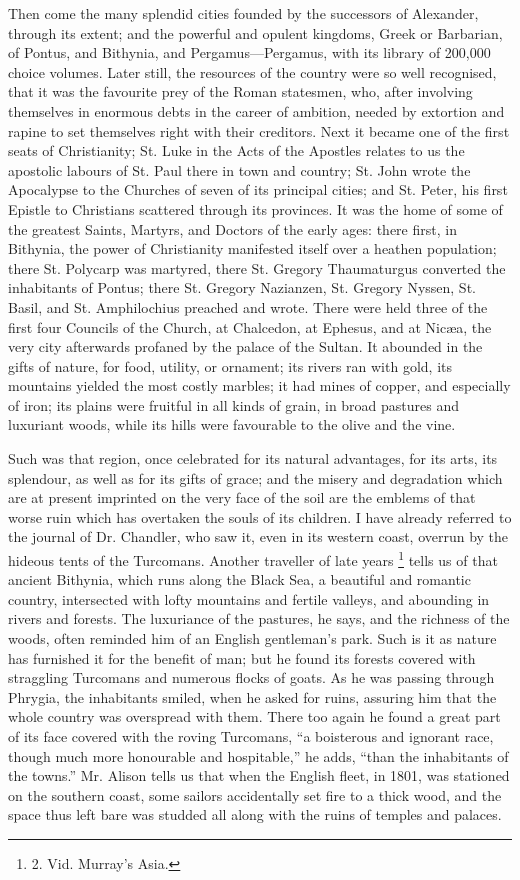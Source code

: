 Then come the many splendid
cities founded by the successors of Alexander, through its extent; and
the powerful and opulent kingdoms, Greek or Barbarian, of Pontus, and
Bithynia, and Pergamus—Pergamus, with its library of 200,000 choice
volumes. Later still, the resources of the country were so well
recognised, that it was the favourite prey of the Roman statesmen,
who, after involving themselves in enormous debts in the career of
ambition, needed by extortion and rapine to set themselves right with
their creditors. Next it became one of the first seats of
Christianity; St. Luke in the Acts of the Apostles relates to us the
apostolic labours of St. Paul there in town and country; St. John
wrote the Apocalypse to the Churches of seven of its principal cities;
and St. Peter, his first Epistle to Christians scattered through its
provinces. It was the home of some of the greatest Saints, Martyrs,
and Doctors of the early ages: there first, in Bithynia, the power of
Christianity manifested itself over a heathen population; there St.
Polycarp was martyred, there St. Gregory Thaumaturgus converted the
inhabitants of Pontus; there St. Gregory Nazianzen, St. Gregory Nyssen,
St. Basil, and St. Amphilochius preached and wrote. There were
held three of the first four Councils of the Church, at Chalcedon, at
Ephesus, and at Nicæa, the very city afterwards profaned by the
palace of the Sultan. It abounded in the gifts of nature, for food,
utility, or ornament; its rivers ran with gold, its mountains yielded
the most costly marbles; it had mines of copper, and especially of
iron; its plains were fruitful in all kinds of grain, in broad
pastures and luxuriant woods, while its hills were favourable to the
olive and the vine.

Such was that region, once
celebrated for its natural advantages, for its arts, its splendour, as
well as for its gifts of grace; and the misery and degradation which
are at present imprinted on the very face of the soil are the emblems
of that worse ruin which has overtaken the souls of its children. I
have already referred to the journal of Dr. Chandler, who saw it, even
in its western coast, overrun by the hideous tents of the Turcomans.
Another traveller of late years \footnote{2.
Vid. Murray's Asia.} tells us of that ancient Bithynia, which runs along the Black
Sea, a beautiful and romantic country, intersected with lofty
mountains and fertile valleys, and abounding in rivers and forests.
The luxuriance of the pastures, he says, and the richness of the
woods, often reminded him of an English gentleman's park. Such is it
as nature has furnished it for the benefit of man; but he found its
forests covered with straggling Turcomans and numerous flocks of
goats. As he was passing through Phrygia, the inhabitants smiled, when
he asked for ruins, assuring him that the whole country was overspread
with them. There too again he found a great part of its face covered
with the roving Turcomans, ``a boisterous and ignorant race, though much more honourable and hospitable,'' he adds, ``than the
inhabitants of the towns.'' Mr. Alison tells us that when the English
fleet, in 1801, was stationed on the southern coast, some sailors
accidentally set fire to a thick wood, and the space thus left bare
was studded all along with the ruins of temples and palaces.

